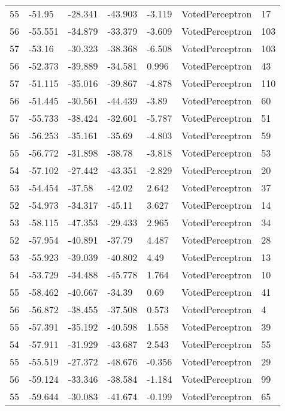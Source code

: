 \begin{tabular}{lllllll}
55 &  -51.95 & -28.341 & -43.903 &  -3.119 &    VotedPerceptron &   17 \\
56 & -55.551 & -34.879 & -33.379 &  -3.609 &    VotedPerceptron &  103 \\
57 &  -53.16 & -30.323 & -38.368 &  -6.508 &    VotedPerceptron &  103 \\
56 & -52.373 & -39.889 & -34.581 &   0.996 &    VotedPerceptron &   43 \\
57 & -51.115 & -35.016 & -39.867 &  -4.878 &    VotedPerceptron &  110 \\
56 & -51.445 & -30.561 & -44.439 &   -3.89 &    VotedPerceptron &   60 \\
57 & -55.733 & -38.424 & -32.601 &  -5.787 &    VotedPerceptron &   51 \\
56 & -56.253 & -35.161 &  -35.69 &  -4.803 &    VotedPerceptron &   59 \\
55 & -56.772 & -31.898 &  -38.78 &  -3.818 &    VotedPerceptron &   53 \\
54 & -57.102 & -27.442 & -43.351 &  -2.829 &    VotedPerceptron &   20 \\
53 & -54.454 &  -37.58 &  -42.02 &   2.642 &    VotedPerceptron &   37 \\
52 & -54.973 & -34.317 &  -45.11 &   3.627 &    VotedPerceptron &   14 \\
53 & -58.115 & -47.353 & -29.433 &   2.965 &    VotedPerceptron &   34 \\
52 & -57.954 & -40.891 &  -37.79 &   4.487 &    VotedPerceptron &   28 \\
53 & -55.923 & -39.039 & -40.802 &    4.49 &    VotedPerceptron &   13 \\
54 & -53.729 & -34.488 & -45.778 &   1.764 &    VotedPerceptron &   10 \\
55 & -58.462 & -40.667 &  -34.39 &    0.69 &    VotedPerceptron &   41 \\
56 & -56.872 & -38.455 & -37.508 &   0.573 &    VotedPerceptron &    4 \\
55 & -57.391 & -35.192 & -40.598 &   1.558 &    VotedPerceptron &   39 \\
54 & -57.911 & -31.929 & -43.687 &   2.543 &    VotedPerceptron &   55 \\
55 & -55.519 & -27.372 & -48.676 &  -0.356 &    VotedPerceptron &   29 \\
56 & -59.124 & -33.346 & -38.584 &  -1.184 &    VotedPerceptron &   99 \\
55 & -59.644 & -30.083 & -41.674 &  -0.199 &    VotedPerceptron &   65 \\

\end{tabular}

